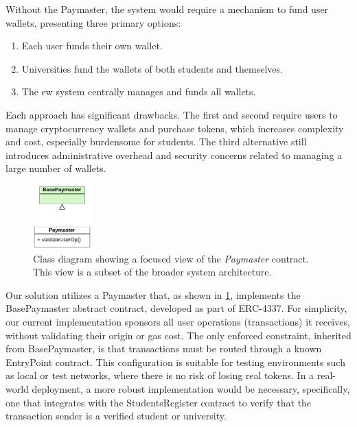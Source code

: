 Without the Paymaster, the system would require a mechanism to fund user wallets, presenting three primary options:

\begin{enumerate}
    \item Each user funds their own wallet.
    \item Universities fund the wallets of both students and themselves.
    \item The \acrshort{ew} system centrally manages and funds all wallets.
\end{enumerate}
Each approach has significant drawbacks. The first and second require users to manage cryptocurrency wallets and purchase tokens, which increases complexity and cost, especially burdensome for students. The third alternative still introduces administrative overhead and security concerns related to managing a large number of wallets.

\begin{figure}
  \centering
  \includegraphics[width=0.2\textwidth]{figures/Paymaster class diagram.pdf}
  \caption[Class diagram focused on \textit{Paymaster} contract]{Class diagram showing a focused view of the \textit{Paymaster} contract. This view is a subset of the broader system architecture.}
  \label{fig:paymasterContractClass}
\end{figure}
Our solution utilizes a Paymaster that, as shown in \cref{fig:paymasterContractClass}, implements the BasePaymaster abstract contract, developed as part of ERC-4337. For simplicity, our current implementation sponsors all user operations (transactions) it receives, without validating their origin or gas cost. The only enforced constraint, inherited from BasePaymaster, is that transactions must be routed through a known EntryPoint contract.
This configuration is suitable for testing environments such as local or test networks, where there is no risk of losing real tokens. In a real-world deployment, a more robust implementation would be necessary, specifically, one that integrates with the StudentsRegister contract to verify that the transaction sender is a verified student or university. 